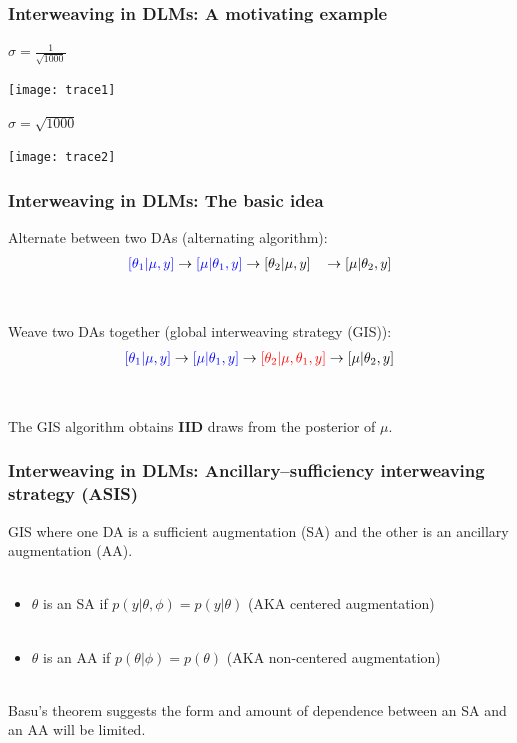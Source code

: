 \documentclass[xcolor=dvipsnames]{beamer}
\begin{document}
\begin{frame}
\frametitle{Interweaving in DLMs: A motivating example}
$\sigma=\frac{1}{\sqrt{1000}}$
\begin{center}
\texttt{[image: trace1]}\\
\end{center}
$\sigma=\sqrt{1000}$
\begin{center}
\texttt{[image: trace2]}
\end{center}
\end{frame}

\begin{frame}
\frametitle{Interweaving in DLMs: The basic idea}
Alternate between two DAs (alternating algorithm):
\begin{align*}
{\color{blue}[\theta_1|\mu,y]} \to {\color{blue}[\mu|\theta_1,y]} \to [\theta_2|\mu,y]\phantom{\theta_1} \to [\mu|\theta_2,y]
\end{align*}\\~\\
\pause Weave two DAs together (global interweaving strategy (GIS)):
\begin{align*}
{\color{blue}[\theta_1|\mu,y]} \to {\color{blue}[\mu|\theta_1,y]} \to {\color{red}[\theta_2|\mu,\theta_1,y]} \to [\mu|\theta_2,y]
\end{align*}\\~\\\pause
The GIS algorithm obtains {\bf IID} draws from the posterior of $\mu$.
\end{frame}

\begin{frame}
\frametitle{Interweaving in DLMs: Ancillary--sufficiency interweaving strategy (ASIS)}
GIS where one DA is a sufficient augmentation (SA) and the other is an ancillary augmentation (AA).\\~\\
\begin{itemize}
\item$\theta$ is an SA if $p(y|\theta,\phi)=p(y|\theta)$ (AKA centered augmentation)\\~\\
\item$\theta$ is an AA if $p(\theta|\phi)=p(\theta)$ (AKA non-centered augmentation)\\~\\
\end{itemize}
\pause Basu's theorem suggests the form and amount of dependence between an SA and an AA will be limited.
\end{frame}
\end{document}

